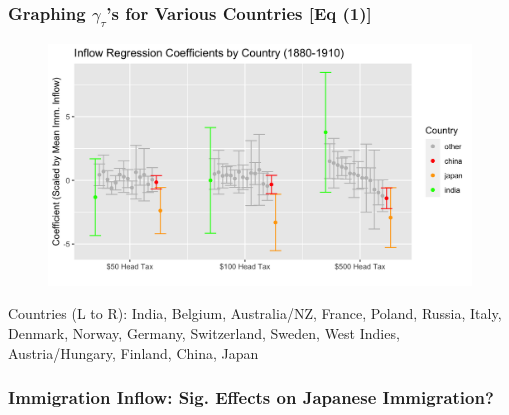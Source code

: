 \documentclass[pdf]{beamer}
\begin{document}
\begin{frame}[label = country_regs]
    \frametitle{Graphing $\gamma_\tau$'s for Various Countries [Eq (1)]}
    \begin{figure}
        \includegraphics[width = \textwidth]{../../figs/8aug23/reg_coefs.png}
    \end{figure}
    \scriptsize
    Countries (L to R): India, Belgium, Australia/NZ, France, Poland, Russia, Italy, Denmark, Norway, Germany, Switzerland, Sweden, West Indies, Austria/Hungary, Finland, China, Japan
\end{frame}

\begin{frame}[label = tab2_flow]
    \frametitle{Immigration Inflow: Sig. Effects on Japanese Immigration?}
    \centering
    \begin{table}[H]
		\resizebox{\textwidth}{!}{
            
		}
	\end{table}  
    \hyperlink{census_flow}{}
\end{frame}
\end{document}
